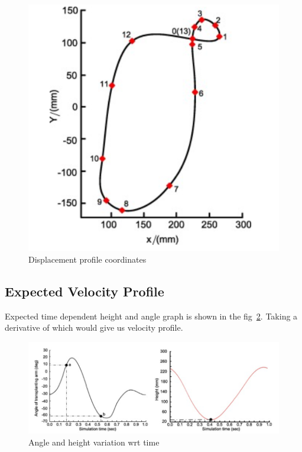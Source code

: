 \documentclass[a4paper,latin,center,onecolumn]{paper}
\begin{document}
            \begin{figure}[hbt!]
                \centering
                \includegraphics[width=0.9\columnwidth]{Images/displacement_profile_2.png}
                \caption{Displacement profile coordinates}
                \label{fig:dispPro2}
            \end{figure}


        \subsection{Expected Velocity Profile}
            Expected time dependent height and angle graph is shown in the fig~\ref{fig:angleHeight}. Taking a derivative of which would give us velocity profile.

            \begin{figure}[hbt!]
                \centering
                \includegraphics[width=0.9\columnwidth]{Images/height_and_angle_wrt_time.png}
                \caption{Angle and height variation wrt time}
                \label{fig:angleHeight}
            \end{figure}
\end{document}
